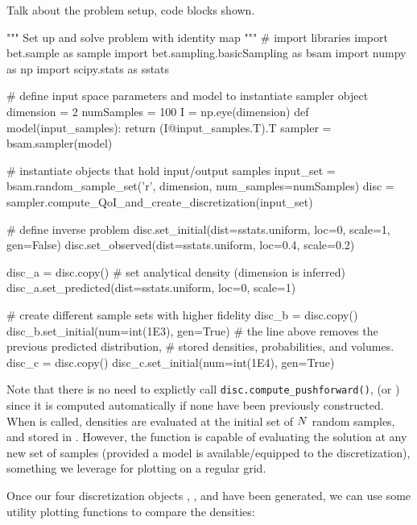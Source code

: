 
Talk about the problem setup, code blocks shown.

\begin{python}
"""
Set up and solve problem with identity map
"""
# import libraries
import bet.sample as sample
import bet.sampling.basicSampling as bsam
import numpy as np
import scipy.stats as sstats

# define input space parameters and model to instantiate sampler object
dimension = 2
numSamples = 100
I = np.eye(dimension)
def model(input_samples):
        return (I@input_samples.T).T
sampler = bsam.sampler(model)

# instantiate objects that hold input/output samples
input_set = bsam.random_sample_set('r', dimension, num_samples=numSamples)
disc = sampler.compute_QoI_and_create_discretization(input_set)

# define inverse problem
disc.set_initial(dist=sstats.uniform, loc=0, scale=1, gen=False)
disc.set_observed(dist=sstats.uniform, loc=0.4, scale=0.2)

disc_a = disc.copy()
# set analytical density (dimension is inferred)
disc_a.set_predicted(dist=sstats.uniform, loc=0, scale=1)

# create different sample sets with higher fidelity
disc_b = disc.copy()
disc_b.set_initial(num=int(1E3), gen=True)
# the line above removes the previous predicted distribution,
#     stored densities, probabilities, and volumes.
disc_c = disc.copy()
disc_c.set_initial(num=int(1E4), gen=True)
\end{python}

Note that there is no need to explictly call {\tt disc.compute\_pushforward()}, (or ) since it is computed automatically if none have been previously constructed.
When  is called, densities are evaluated at the initial set of $N$ random samples, and stored in .
However, the function  is capable of evaluating the solution at any new set of samples (provided a model is available/equipped to the discretization), something we leverage for plotting on a regular grid.

Once our four discretization objects , ,  and  have been generated, we can use some utility plotting functions to compare the densities:


